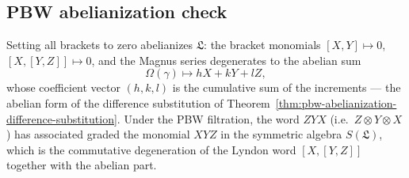 \subsection{PBW abelianization check}

Setting all brackets to zero abelianizes $\mathfrak L$: the bracket monomials
$[X,Y]\mapsto0$, $[X,[Y,Z]]\mapsto0$, and the Magnus series degenerates to the
abelian sum
\[
  \Omega(\gamma)\mapsto hX+kY+lZ,
\]
whose coefficient vector $(h,k,l)$ is the cumulative sum of the increments ---
the abelian form of the difference substitution of
Theorem~\ref{thm:pbw-abelianization-difference-substitution}.  Under the PBW
filtration, the word $ZYX$ (i.e.\ $Z\otimes Y\otimes X$) has associated graded
the monomial $XYZ$ in the symmetric algebra $S(\mathfrak L)$, which is the
commutative degeneration of the Lyndon word $[X,[Y,Z]]$ together with the
abelian part.
